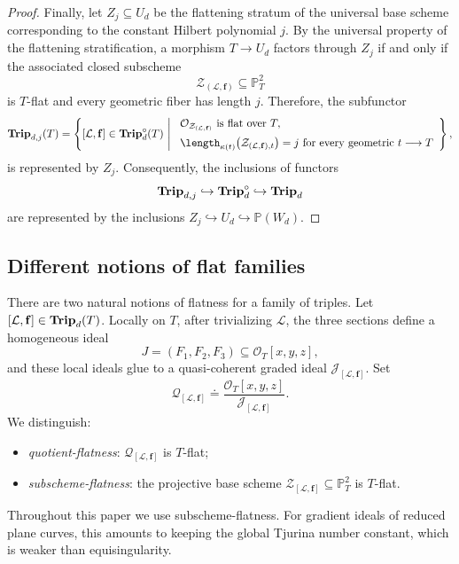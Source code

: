 \documentclass[11pt]{amsart} %
\newcommand{\lar}{\longrightarrow}
\theoremstyle{definition}
\def\NZQ{\mathbb}               %
\def\PP{{\NZQ P}}
\def\Trip{{\bf Trip}}
\begin{document}
\begin{proof}
Finally, let $Z_j\subseteq U_d$ be the flattening stratum of the
universal base scheme corresponding to the constant Hilbert
polynomial $j$. By the universal property of the flattening
stratification, a morphism $T\lar U_d$ factors through $Z_j$ if and
only if the associated closed subscheme
\[
\mathcal Z_{(\mathcal L,\mathbf f)}
\subseteq\PP^2_T
\]
is $T$-flat and every geometric fiber has length $j$. Therefore, the subfunctor
\[
\Trip_{d,j}(T)
=
\left\{
[\mathcal L,\mathbf f]\in\Trip_d^\circ(T)
\ \middle|\
\begin{array}{l}
\mathcal O_{\mathcal Z_{(\mathcal L,\mathbf f)}}\text{ is flat over }T,\\[2mm]
\length_{\kappa(t)}
\bigl(\mathcal Z_{(\mathcal L,\mathbf f),t}\bigr)=j
\text{ for every geometric }t\lar T
\end{array}
\right\},
\]
is represented by $Z_j$. Consequently, the inclusions of functors
\[
\Trip_{d,j}\hookrightarrow
\Trip_d^\circ\hookrightarrow
\Trip_d
\]
are represented by the inclusions \(Z_j\hookrightarrow U_d\hookrightarrow\PP(W_d)\).
\end{proof}

\subsection{Different notions of flat families}
\label{subsec:different-flatness}

There are two natural notions of flatness for a family of triples.
Let \([\mathcal L,\mathbf f]\in\Trip_d(T)\). Locally on $T$, after trivializing $\mathcal L$, the three sections
define a homogeneous ideal
\[
J=(F_1,F_2,F_3)\subseteq\mathcal O_T[x,y,z],
\]
and these local ideals glue to a quasi-coherent graded ideal
$\mathcal J_{[\mathcal L,\mathbf f]}$. Set
\[
\mathcal Q_{[\mathcal L,\mathbf f]}
\doteq
\frac{\mathcal O_T[x,y,z]}
     {\mathcal J_{[\mathcal L,\mathbf f]}}.
\]
We distinguish:

\begin{itemize}
\item[(a)] \emph{quotient-flatness}: $\mathcal Q_{[\mathcal L,\mathbf f]}$
is $T$-flat;

\item[(b)] \emph{subscheme-flatness}: the projective base scheme \(\mathcal Z_{[\mathcal L,\mathbf f]}
\subseteq\PP^2_T\) is $T$-flat.
\end{itemize}

Throughout this paper we use subscheme-flatness. For gradient ideals
of reduced plane curves, this amounts to keeping the global Tjurina
number constant, which is weaker than equisingularity.
\end{document}
